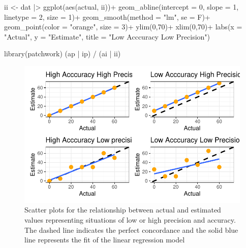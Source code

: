 \documentclass[
  letterpaper,
  DIV=11,
  numbers=noendperiod]{scrreprt}
\newenvironment{Shaded}{\begin{snugshade}}{\end{snugshade}}
\newcommand{\AttributeTok}[1]{\textcolor[rgb]{0.40,0.45,0.13}{#1}}
\newcommand{\DecValTok}[1]{\textcolor[rgb]{0.68,0.00,0.00}{#1}}
\newcommand{\FunctionTok}[1]{\textcolor[rgb]{0.28,0.35,0.67}{#1}}
\newcommand{\NormalTok}[1]{\textcolor[rgb]{0.00,0.23,0.31}{#1}}
\newcommand{\OtherTok}[1]{\textcolor[rgb]{0.00,0.23,0.31}{#1}}
\newcommand{\SpecialCharTok}[1]{\textcolor[rgb]{0.37,0.37,0.37}{#1}}
\newcommand{\StringTok}[1]{\textcolor[rgb]{0.13,0.47,0.30}{#1}}
\begin{document}
\begin{Shaded}
\begin{Highlighting}[]
\NormalTok{ii }\OtherTok{\textless{}{-}}\NormalTok{ dat }\SpecialCharTok{|\textgreater{}} 
  \FunctionTok{ggplot}\NormalTok{(}\FunctionTok{aes}\NormalTok{(actual, ii))}\SpecialCharTok{+}
  \FunctionTok{geom\_abline}\NormalTok{(}\AttributeTok{intercept =} \DecValTok{0}\NormalTok{, }\AttributeTok{slope =} \DecValTok{1}\NormalTok{, }
              \AttributeTok{linetype =} \DecValTok{2}\NormalTok{, }\AttributeTok{size =} \DecValTok{1}\NormalTok{)}\SpecialCharTok{+}
  \FunctionTok{geom\_smooth}\NormalTok{(}\AttributeTok{method =} \StringTok{"lm"}\NormalTok{, }\AttributeTok{se =}\NormalTok{ F)}\SpecialCharTok{+}
  \FunctionTok{geom\_point}\NormalTok{(}\AttributeTok{color =} \StringTok{"orange"}\NormalTok{, }\AttributeTok{size =} \DecValTok{3}\NormalTok{)}\SpecialCharTok{+}
  \FunctionTok{ylim}\NormalTok{(}\DecValTok{0}\NormalTok{,}\DecValTok{70}\NormalTok{)}\SpecialCharTok{+}
  \FunctionTok{xlim}\NormalTok{(}\DecValTok{0}\NormalTok{,}\DecValTok{70}\NormalTok{)}\SpecialCharTok{+}
  \FunctionTok{labs}\NormalTok{(}\AttributeTok{x =} \StringTok{"Actual"}\NormalTok{, }\AttributeTok{y =} \StringTok{"Estimate"}\NormalTok{,}
       \AttributeTok{title =} \StringTok{"Low Acccuracy Low Precision"}\NormalTok{)}

\FunctionTok{library}\NormalTok{(patchwork)}
\NormalTok{(ap }\SpecialCharTok{|}\NormalTok{ ip) }\SpecialCharTok{/}\NormalTok{ (ai }\SpecialCharTok{|}\NormalTok{ ii)}
\end{Highlighting}
\end{Shaded}

\begin{figure}[H]

{\centering \includegraphics{./data-accuracy_files/figure-pdf/fig-accuracy-1.pdf}

}

\caption{\label{fig-accuracy}Scatter plots for the relationship between
actual and estimated values representing situations of low or high
precision and accuracy. The dashed line indicates the perfect
concordance and the solid blue line represents the fit of the linear
regression model}

\end{figure}
\end{document}
